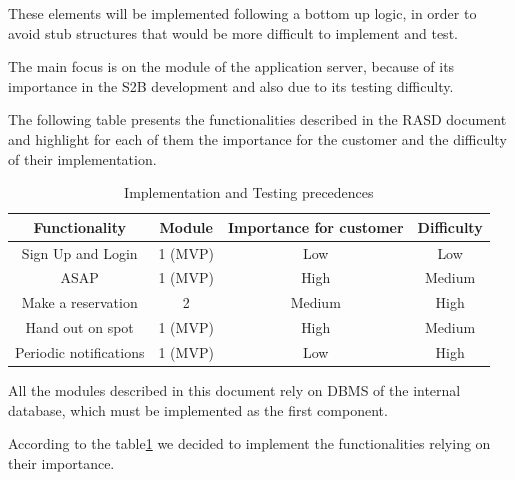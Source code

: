 \documentclass[table, 12pt]{article}
\begin{document}
These elements will be implemented following a bottom up logic, in order to avoid stub structures that would be more difficult to implement and test.

The main focus is on the module of the application server, because of its importance in the S2B development and also due to its testing difficulty.

The following table presents the functionalities described in the RASD document and highlight for each of them the importance for the customer and the difficulty of their implementation.

\begin{center}
    \begin{table}[H]
        \begin{tabular}{ | c |c | c | c |}
            \hline
            \textbf{Functionality} & \textbf{Module} & \textbf{Importance for customer} & \textbf{Difficulty} \\ \hline
            Sign Up and Login      & 1 (MVP)         & Low                              & Low                 \\ \hline
            ASAP                   & 1 (MVP)         & High                             & Medium              \\\hline
            Make a reservation     & 2               & Medium                           & High                \\\hline
            Hand out on spot       & 1 (MVP)         & High                             & Medium              \\\hline
            Periodic notifications & 1 (MVP)         & Low                              & High                \\
            \hline
        \end{tabular}
        \caption{Implementation and Testing precedences}\label{implementation_precedences}
    \end{table}
\end{center}

All the modules described in this document rely on DBMS of the internal database, which must be implemented as the first component.

According to the table\ref{implementation_precedences} we decided to implement the functionalities relying on their importance.
\end{document}
